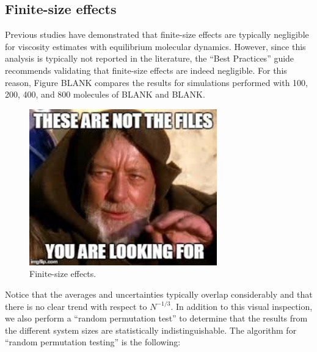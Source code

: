 \documentclass[preprint,review,12pt]{elsarticle}
\begin{document}
	\subsection{Finite-size effects}
	
	Previous studies have demonstrated that finite-size effects are typically negligible for viscosity estimates with equilibrium molecular dynamics. However, since this analysis is typically not reported in the literature, the ``Best Practices'' guide recommends validating that finite-size effects are indeed negligible. For this reason, Figure BLANK compares the results for simulations performed with 100, 200, 400, and 800 molecules of BLANK and BLANK.   
		
	\begin{figure}[htb!]
		\centering
		\includegraphics[width=3.2in]{empty_figure.jpg}
		\caption{Finite-size effects.}
		\label{fig:finite_size_effects}
	\end{figure} 

	Notice that the averages and uncertainties typically overlap considerably and that there is no clear trend with respect to $N^{-1/3}$. In addition to this visual inspection, we also perform a ``random permutation test'' to determine that the results from the different system sizes are statistically indistinguishable. The algorithm for ``random permutation testing'' is the following:
	
\end{document}
